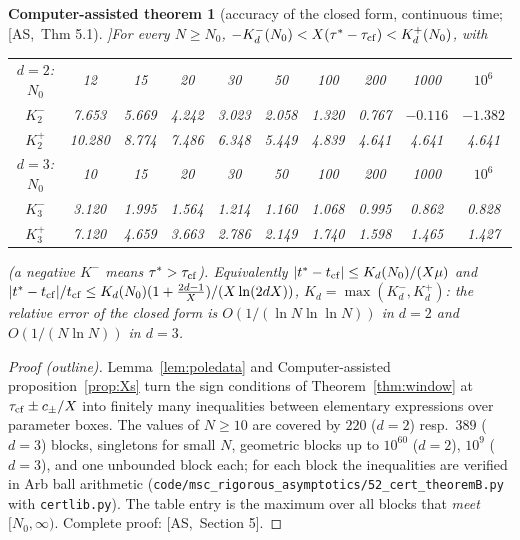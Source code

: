 \documentclass[10pt,a4paper]{article}
\theoremstyle{plain}
\newtheorem{catheorem}[theorem]{Computer-assisted theorem}
\theoremstyle{definition}
\newcommand{\src}[2]{[\textsf{#1},~#2]}           %
\newcommand{\ASY}{\textsf{AS}}
\begin{document}
\begin{catheorem}[accuracy of the closed form, continuous time; \src{\ASY}{Thm 5.1}]\label{thm:cf-cont}
For every $N\ge N_0$, $-K^-_d(N_0)<X(\tau^*-\tau_{\rm cf})<K^+_d(N_0)$, with
\begin{center}\small
\begin{tabular}{c|ccccccccc}
$d=2$: $N_0$ & 12 & 15 & 20 & 30 & 50 & 100 & 200 & 1000 & $10^6$\\
$K^-_2$ & 7.653 & 5.669 & 4.242 & 3.023 & 2.058 & 1.320 & 0.767 & $-0.116$ & $-1.382$\\
$K^+_2$ & 10.280 & 8.774 & 7.486 & 6.348 & 5.449 & 4.839 & 4.641 & 4.641 & 4.641\\
\hline
$d=3$: $N_0$ & 10 & 15 & 20 & 30 & 50 & 100 & 200 & 1000 & $10^6$\\
$K^-_3$ & 3.120 & 1.995 & 1.564 & 1.214 & 1.160 & 1.068 & 0.995 & 0.862 & 0.828\\
$K^+_3$ & 7.120 & 4.659 & 3.663 & 2.786 & 2.149 & 1.740 & 1.598 & 1.465 & 1.427
\end{tabular}
\end{center}
(a negative $K^-$ means $\tau^*>\tau_{\rm cf}$). Equivalently $|t^*-t_{\rm cf}|\le K_d(N_0)/(X\mu)$ and $|t^*-t_{\rm cf}|/t_{\rm cf}\le K_d(N_0)(1+\frac{2d-1}X)/(X\ln(2dX))$, $K_d=\max(K^-_d,K^+_d)$: the relative error of the closed form is $O(1/(\ln N\ln\ln N))$ in $d=2$ and $O(1/(N\ln N))$ in $d=3$.
\end{catheorem}
\begin{proof}[Proof (outline)]
Lemma~\ref{lem:poledata} and Computer-assisted proposition~\ref{prop:Xs} turn the sign conditions of Theorem~\ref{thm:window} at $\tau_{\rm cf}\pm c_\pm/X$ into finitely many inequalities between elementary expressions over parameter boxes. The values of $N\ge10$ are covered by $220$ ($d=2$) resp.\ $389$ ($d=3$) blocks, singletons for small $N$, geometric blocks up to $10^{60}$ ($d=2$), $10^9$ ($d=3$), and one unbounded block each; for each block the inequalities are verified in Arb ball arithmetic (\texttt{code/msc\_rigorous\_asymptotics/52\_cert\_theoremB.py} with \texttt{certlib.py}). The table entry is the maximum over all blocks that \emph{meet} $[N_0,\infty)$. Complete proof: \src{\ASY}{Section 5}.
\end{proof}
\end{document}
